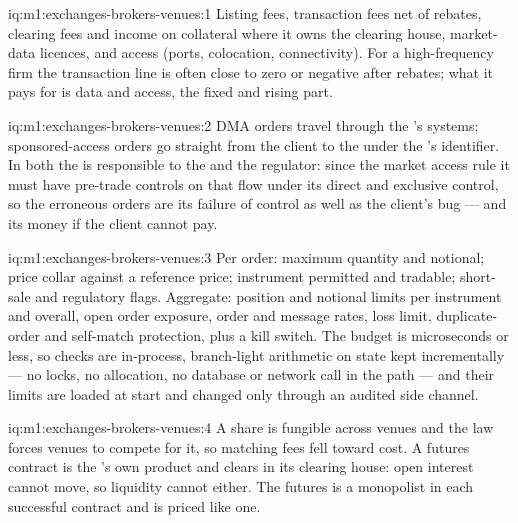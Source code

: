 \begin{solution}{iq:m1:exchanges-brokers-venues:1}
Listing fees, transaction fees net of rebates, clearing fees and income on
collateral where it owns the clearing house, market-data licences, and access
(ports, colocation, connectivity). For a high-frequency firm the transaction
line is often close to zero or negative after rebates; what it pays for is
data and access, the fixed and rising part.
\end{solution}

\begin{solution}{iq:m1:exchanges-brokers-venues:2}
DMA orders travel through the 's systems; sponsored-access orders go
straight from the client to the  under the 's identifier. In
both the  is responsible to the  and the regulator: since the
market access rule it must have pre-trade controls on that flow under its
direct and exclusive control, so the erroneous orders are its failure of
control as well as the client's bug --- and its money if the client cannot
pay.
\end{solution}

\begin{solution}{iq:m1:exchanges-brokers-venues:3}
Per order: maximum quantity and notional; price collar against a reference
price; instrument permitted and tradable; short-sale and regulatory flags.
Aggregate: position and notional limits per instrument and overall, open
order exposure, order and message rates, loss limit, duplicate-order and
self-match protection, plus a kill switch. The budget is microseconds or
less, so checks are in-process, branch-light arithmetic on state kept
incrementally --- no locks, no allocation, no database or network call in
the path --- and their limits are loaded at start and changed only through an
audited side channel.
\end{solution}

\begin{solution}{iq:m1:exchanges-brokers-venues:4}
A share is fungible across venues and the law forces venues to compete for
it, so matching fees fell toward cost. A futures contract is the 's
own product and clears in its clearing house: open interest cannot move, so
liquidity cannot either. The futures  is a monopolist in each
successful contract and is priced like one.
\end{solution}


